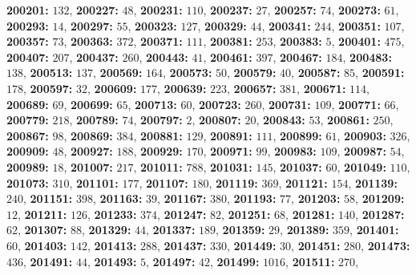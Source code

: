 \textsf{\bfseries 200201:} $132$, \textsf{\bfseries 200227:} $48$, \textsf{\bfseries 200231:} $110$, \textsf{\bfseries 200237:} $27$, \textsf{\bfseries 200257:} $74$, \textsf{\bfseries 200273:} $61$, \textsf{\bfseries 200293:} $14$, \textsf{\bfseries 200297:} $55$, \textsf{\bfseries 200323:} $127$, \textsf{\bfseries 200329:} $44$, \textsf{\bfseries 200341:} $244$, \textsf{\bfseries 200351:} $107$, \textsf{\bfseries 200357:} $73$, \textsf{\bfseries 200363:} $372$, \textsf{\bfseries 200371:} $111$, \textsf{\bfseries 200381:} $253$, \textsf{\bfseries 200383:} $5$, \textsf{\bfseries 200401:} $475$, \textsf{\bfseries 200407:} $207$, \textsf{\bfseries 200437:} $260$, \textsf{\bfseries 200443:} $41$, \textsf{\bfseries 200461:} $397$, \textsf{\bfseries 200467:} $184$, \textsf{\bfseries 200483:} $138$, \textsf{\bfseries 200513:} $137$, \textsf{\bfseries 200569:} $164$, \textsf{\bfseries 200573:} $50$, \textsf{\bfseries 200579:} $40$, \textsf{\bfseries 200587:} $85$, \textsf{\bfseries 200591:} $178$, \textsf{\bfseries 200597:} $32$, \textsf{\bfseries 200609:} $177$, \textsf{\bfseries 200639:} $223$, \textsf{\bfseries 200657:} $381$, \textsf{\bfseries 200671:} $114$, \textsf{\bfseries 200689:} $69$, \textsf{\bfseries 200699:} $65$, \textsf{\bfseries 200713:} $60$, \textsf{\bfseries 200723:} $260$, \textsf{\bfseries 200731:} $109$, \textsf{\bfseries 200771:} $66$, \textsf{\bfseries 200779:} $218$, \textsf{\bfseries 200789:} $74$, \textsf{\bfseries 200797:} $2$, \textsf{\bfseries 200807:} $20$, \textsf{\bfseries 200843:} $53$, \textsf{\bfseries 200861:} $250$, \textsf{\bfseries 200867:} $98$, \textsf{\bfseries 200869:} $384$, \textsf{\bfseries 200881:} $129$, \textsf{\bfseries 200891:} $111$, \textsf{\bfseries 200899:} $61$, \textsf{\bfseries 200903:} $326$, \textsf{\bfseries 200909:} $48$, \textsf{\bfseries 200927:} $188$, \textsf{\bfseries 200929:} $170$, \textsf{\bfseries 200971:} $99$, \textsf{\bfseries 200983:} $109$, \textsf{\bfseries 200987:} $54$, \textsf{\bfseries 200989:} $18$, \textsf{\bfseries 201007:} $217$, \textsf{\bfseries 201011:} $788$, \textsf{\bfseries 201031:} $145$, \textsf{\bfseries 201037:} $60$, \textsf{\bfseries 201049:} $110$, \textsf{\bfseries 201073:} $310$, \textsf{\bfseries 201101:} $177$, \textsf{\bfseries 201107:} $180$, \textsf{\bfseries 201119:} $369$, \textsf{\bfseries 201121:} $154$, \textsf{\bfseries 201139:} $240$, \textsf{\bfseries 201151:} $398$, \textsf{\bfseries 201163:} $39$, \textsf{\bfseries 201167:} $380$, \textsf{\bfseries 201193:} $77$, \textsf{\bfseries 201203:} $58$, \textsf{\bfseries 201209:} $12$, \textsf{\bfseries 201211:} $126$, \textsf{\bfseries 201233:} $374$, \textsf{\bfseries 201247:} $82$, \textsf{\bfseries 201251:} $68$, \textsf{\bfseries 201281:} $140$, \textsf{\bfseries 201287:} $62$, \textsf{\bfseries 201307:} $88$, \textsf{\bfseries 201329:} $44$, \textsf{\bfseries 201337:} $189$, \textsf{\bfseries 201359:} $29$, \textsf{\bfseries 201389:} $359$, \textsf{\bfseries 201401:} $60$, \textsf{\bfseries 201403:} $142$, \textsf{\bfseries 201413:} $288$, \textsf{\bfseries 201437:} $330$, \textsf{\bfseries 201449:} $30$, \textsf{\bfseries 201451:} $280$, \textsf{\bfseries 201473:} $436$, \textsf{\bfseries 201491:} $44$, \textsf{\bfseries 201493:} $5$, \textsf{\bfseries 201497:} $42$, \textsf{\bfseries 201499:} $1016$, \textsf{\bfseries 201511:} $270$, 

